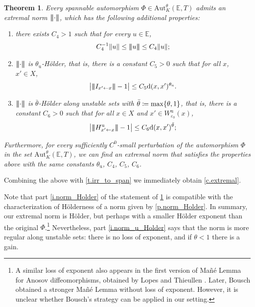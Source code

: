 \documentclass[JEP,XML,SOM,Unicode]{cedram}
\def\vcentcolon{\mathrel{\mathop\ordinarycolon}}
\providecommand\ordinarycolon{:}
\providecommand*\coloneqq{\vcentcolon\mathrel{\mkern-1.2mu}=}
\theoremstyle{plain}
\newtheorem{theorem}{Theorem}[section]
\theoremstyle{definition}
\newcommand{\tribar}[1]{\mathopen{| {\kern -1.5pt} | {\kern -1.5pt} |} {#1}
\mathclose{| {\kern -1.5pt} | {\kern -1.5pt} |}}
\newcommand{\EE}{\mathbb{E}}
\newcommand{\dd}{\mathrm{d}}
\newcommand{\uu}{\mathrm{u}}
\newcommand{\Aut}{\mathrm{Aut}}
\let\epsilon\varepsilon
\begin{document}
\begin{theorem}\label{t.extremal}
Every spannable automorphism $\Phi \in \Aut^\theta_K(\EE,T)$ admits an extremal norm $\tribar{\mathord{\cdot}}$,
which has the following additional properties:
\begin{enumerate}

\item\label{i.norm_eccentricity}
there exists $C_4 > 1$ such that for every $u \in \EE$,
\begin{equation}\label{e.eccentricity}
C_4^{-1} \|u\| \le \tribar{u} \le C_4 \|u\| ;
\end{equation}

\item\label{i.norm_Holder}
$\tribar{\mathord{\cdot}}$ is $\theta_\uu$-Hölder, that is, there is a constant $C_5>0$ such that for all $x$, $x'\in X$,%
\begin{equation}\label{e.norm_Holder}
\big| \tribar{I_{x' \gets x}} - 1 \big| \le C_5 \dd(x,x')^{\theta_\uu}.
\end{equation}

\item\label{i.norm_u_Holder}
$\tribar{\mathord{\cdot}}$ is $\bar\theta$-Hölder along unstable sets with $\bar\theta \coloneqq \max\{\theta,1\}$, that is, there is a constant $C_6>0$ such that for all $x \in X$ and $x' \in W^\uu_{\epsilon_0}(x)$,
\begin{equation}\label{e.norm_u_Holder}
\big| \tribar{H^\uu_{x' \gets x}} - 1 \big| \le C_6 \dd(x,x')^{\bar\theta} ;
\end{equation}

\end{enumerate}
Furthermore, for every sufficiently $C^0$-small perturbation of the automorphism $\Phi$ in the set $\Aut^\theta_K(\EE,T)$, we can find an extremal norm that satisfies the properties above with the same constants $\theta_\uu$, $C_4$, $C_5$, $C_6$.

\end{theorem}

Combining the  above with \cref{t.irr_to_span} we immediately obtain \cref{c.extremal}.

Note that part \eqref{i.norm_Holder} of the statement of \cref{t.extremal} is compatible with the characterization of Hölderness of a norm given by \cref{p.norm_Holder}.
In summary, our extremal norm is Hölder, but perhaps with a smaller Hölder exponent than the original $\Phi$.\footnote{A similar loss of exponent also appears in the first version of Mañé Lemma for Anosov diffeomorphisms, obtained by Lopes and Thieullen \cite{LopesT}. Later, Bousch \cite{Bousch_amphi} obtained a stronger Mañé Lemma without loss of exponent. However, it is unclear whether Bousch's strategy can be applied in our setting.}
Nevertheless, part \eqref{i.norm_u_Holder} says that the norm is more regular along unstable sets: there is no loss of exponent, and if $\theta<1$ there is a gain.
\end{document}
